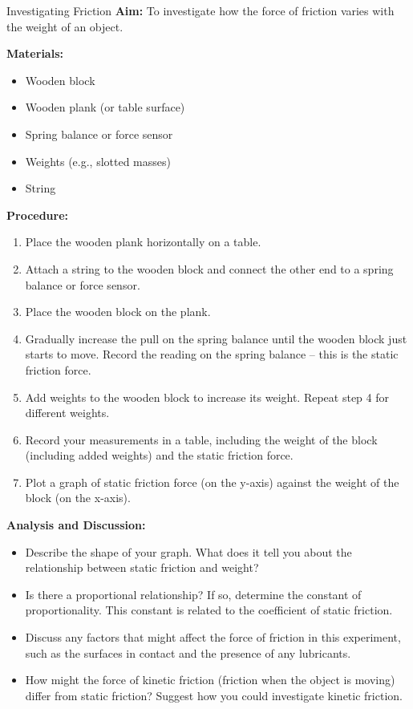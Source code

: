 \begin{investigation}{Investigating Friction}
\textbf{Aim:} To investigate how the force of friction varies with the weight of an object.

\textbf{Materials:}
\begin{itemize}
    \item Wooden block
    \item Wooden plank (or table surface)
    \item Spring balance or force sensor
    \item Weights (e.g., slotted masses)
    \item String
\end{itemize}

\textbf{Procedure:}
\begin{enumerate}
    \item Place the wooden plank horizontally on a table.
    \item Attach a string to the wooden block and connect the other end to a spring balance or force sensor.
    \item Place the wooden block on the plank.
    \item Gradually increase the pull on the spring balance until the wooden block just starts to move. Record the reading on the spring balance – this is the static friction force.
    \item Add weights to the wooden block to increase its weight.  Repeat step 4 for different weights.
    \item Record your measurements in a table, including the weight of the block (including added weights) and the static friction force.
    \item Plot a graph of static friction force (on the y-axis) against the weight of the block (on the x-axis).
\end{enumerate}

\textbf{Analysis and Discussion:}
\begin{itemize}
    \item Describe the shape of your graph. What does it tell you about the relationship between static friction and weight?
    \item Is there a proportional relationship? If so, determine the constant of proportionality. This constant is related to the coefficient of static friction.
    \item Discuss any factors that might affect the force of friction in this experiment, such as the surfaces in contact and the presence of any lubricants.
    \item How might the force of kinetic friction (friction when the object is moving) differ from static friction? Suggest how you could investigate kinetic friction.
\end{itemize}
\end{investigation}


